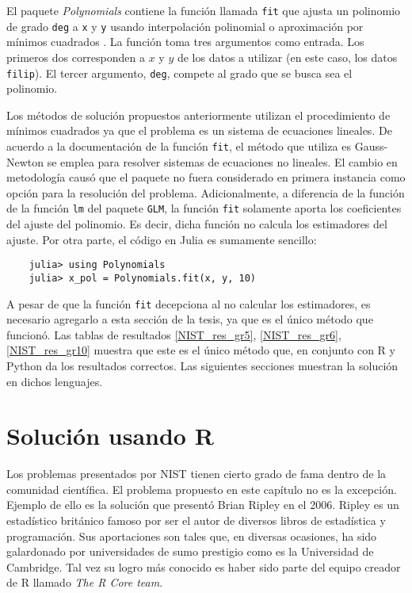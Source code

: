 El paquete \textit{Polynomials} contiene la función llamada \texttt{fit} que ajusta un polinomio de grado \texttt{deg} a \texttt{x} y \texttt{y} usando interpolación polinomial o aproximación por mínimos cuadrados \cite{poly_manual}. La función toma tres argumentos como entrada. Los primeros dos corresponden a $x$ y $y$ de los datos a utilizar (en este caso, los datos \texttt{filip}). El tercer argumento, \texttt{deg},  compete al grado que se busca sea el polinomio. 

Los métodos de solución propuestos anteriormente utilizan el procedimiento de mínimos cuadrados ya que el problema es un sistema de ecuaciones lineales. De acuerdo a la documentación de la función \texttt{fit}, el método que utiliza es Gauss-Newton se emplea para resolver sistemas de ecuaciones no lineales. El cambio en metodología causó que el paquete no fuera considerado en primera instancia como opción para la resolución del problema. Adicionalmente, a diferencia de la función de la función \texttt{lm} del paquete \texttt{GLM}, la función \texttt{fit} solamente aporta los coeficientes del ajuste del polinomio. Es decir, dicha función no calcula los estimadores del ajuste. Por otra parte, el código en \textsf{Julia} es sumamente sencillo: 

\begin{verbatim}
	julia> using Polynomials 
	julia> x_pol = Polynomials.fit(x, y, 10)
\end{verbatim}

A pesar de que la función \texttt{fit} decepciona al no calcular los estimadores, es necesario agregarlo a esta  sección de la tesis, ya que es el único método que funcionó. Las tablas de resultados \ref{NIST_res_gr5}, \ref{NIST_res_gr6}, \ref{NIST_res_gr10} muestra que este es el único método que, en conjunto con \textsf{R} y \textsf{Python} da los resultados correctos. Las siguientes secciones muestran la solución en dichos lenguajes. 

\section{Solución usando R}

Los problemas presentados por NIST tienen cierto grado de fama dentro de la comunidad científica. El problema propuesto en este capítulo no es la excepción. Ejemplo de ello es la solución que presentó Brian Ripley en el 2006. Ripley es un estadístico británico famoso por ser el autor de diversos libros de estadística y programación. Sus aportaciones son tales que, en diversas ocasiones, ha sido galardonado por universidades de sumo prestigio como es la Universidad de Cambridge. Tal vez su logro más conocido es haber sido parte del equipo creador de \textsf{R} llamado \textit{The R Core team}. 

